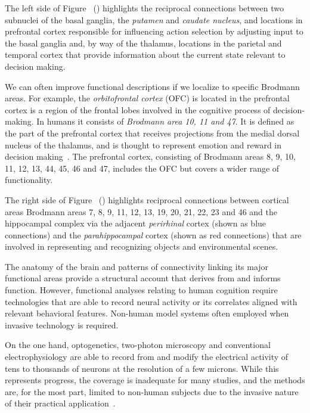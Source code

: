 The left side of Figure~{} ({}) highlights the reciprocal connections between two subnuclei of the basal ganglia, the {\it{putamen}} and {\it{caudate nucleus}}, and locations in prefrontal cortex responsible for influencing action selection by adjusting input to the basal ganglia and, by way of the thalamus, locations in the parietal and temporal cortex that provide information about the current state relevant to decision making. 

We can often improve functional descriptions if we localize to specific Brodmann areas. For example, the {\it{orbitofrontal cortex}} (OFC) is located in the prefrontal cortex is a region of the frontal lobes involved in the cognitive process of decision-making. In humans it consists of {\it{Brodmann area 10, 11 and 47}}. It is defined as the part of the prefrontal cortex that receives projections from the medial dorsal nucleus of the thalamus, and is thought to represent emotion and reward in decision making~\cite{BotvinickandAnANIPS-09}. The prefrontal cortex, consisting of Brodmann areas 8, 9, 10, 11, 12, 13, 44, 45, 46 and 47, includes the OFC but covers a wider range of functionality.

The right side of Figure~{} ({}) highlights reciprocal connections between cortical areas {\emdash{}} Brodmann areas 7, 8, 9, 11, 12, 13, 19, 20, 21, 22, 23 and 46 {\emdash{}} and the hippocampal complex via the adjacent {\it{perirhinal}} cortex (shown as blue connections) and the {\it{parahippocampal}} cortex (shown as red connections) that are involved in representing and recognizing objects and environmental scenes.

The anatomy of the brain and patterns of connectivity linking its major functional areas provide a structural account that derives from and informs function. However, functional analyses relating to human cognition require technologies that are able to record neural activity or its correlates aligned with relevant behavioral features. Non-human model systems often employed when invasive technology is required.

On the one hand, optogenetics, two-photon microscopy and conventional electrophysiology are able to record from and modify the electrical activity of tens to thousands of neurons at the resolution of a few microns. While this represents progress, the coverage is inadequate for many studies, and the methods are, for the most part, limited to non-human subjects due to the invasive nature of their practical application~\cite{DombeckandTankCSH-11,BoydenBIOLOGY-11,ZhangetalNATURE-10,YizharetalNEURON-11}.

